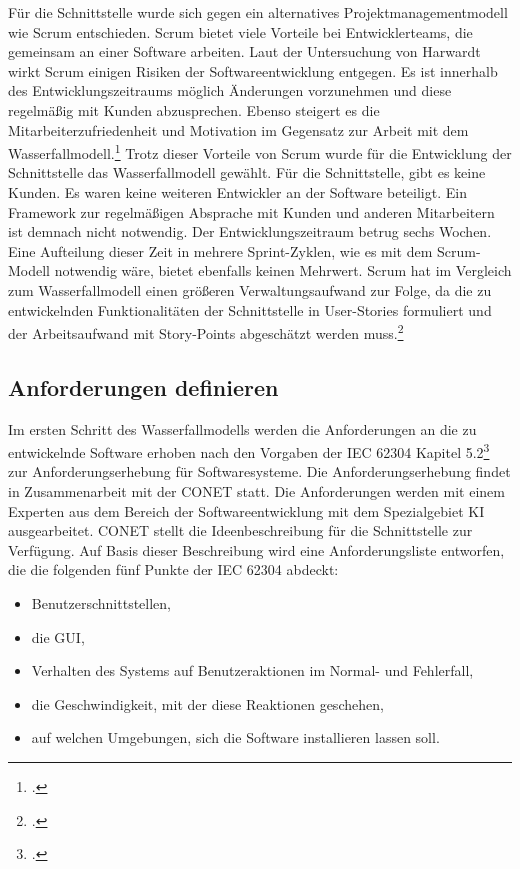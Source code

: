 Für die Schnittstelle wurde sich gegen ein alternatives Projektmanagementmodell wie Scrum entschieden. Scrum bietet viele Vorteile bei Entwicklerteams, die gemeinsam an einer Software arbeiten. Laut der Untersuchung von Harwardt wirkt Scrum einigen Risiken der Softwareentwicklung entgegen. Es ist innerhalb des Entwicklungszeitraums möglich Änderungen vorzunehmen und diese regelmäßig mit Kunden abzusprechen. Ebenso steigert es die Mitarbeiterzufriedenheit und Motivation im Gegensatz zur Arbeit mit dem Wasserfallmodell.\footcite{harwardt2012wasserfallmodell} Trotz dieser Vorteile von Scrum wurde für die Entwicklung der Schnittstelle das Wasserfallmodell gewählt. Für die Schnittstelle, gibt es keine Kunden. Es waren keine weiteren Entwickler an der Software beteiligt. Ein Framework zur regelmäßigen Absprache mit Kunden und anderen Mitarbeitern ist demnach nicht notwendig. Der Entwicklungszeitraum betrug sechs Wochen. Eine Aufteilung dieser Zeit in mehrere Sprint-Zyklen, wie es mit dem Scrum-Modell notwendig wäre, bietet ebenfalls keinen Mehrwert. Scrum hat im Vergleich zum Wasserfallmodell einen größeren Verwaltungsaufwand zur Folge, da die zu entwickelnden Funktionalitäten der Schnittstelle in User-Stories formuliert und der Arbeitsaufwand mit Story-Points abgeschätzt werden muss.\footcite{wirdemann2022scrum}

\subsection{Anforderungen definieren}
Im ersten Schritt des Wasserfallmodells werden die Anforderungen an die zu entwickelnde Software erhoben nach den Vorgaben der IEC 62304 Kapitel 5.2\footcite{daniel2018anforderungen} zur Anforderungserhebung für Softwaresysteme. Die Anforderungserhebung findet in Zusammenarbeit mit der CONET statt. Die Anforderungen werden mit einem Experten aus dem Bereich der Softwareentwicklung mit dem Spezialgebiet KI ausgearbeitet. CONET stellt die Ideenbeschreibung für die Schnittstelle zur Verfügung. Auf Basis dieser Beschreibung wird eine Anforderungsliste entworfen, die die folgenden fünf Punkte der IEC 62304 abdeckt:

\begin{itemize}
\item Benutzerschnittstellen,
\item die GUI,
\item Verhalten des Systems auf Benutzeraktionen im Normal- und Fehlerfall,
\item die Geschwindigkeit, mit der diese Reaktionen geschehen,
\item auf welchen Umgebungen, sich die Software installieren lassen soll.
\end{itemize}

